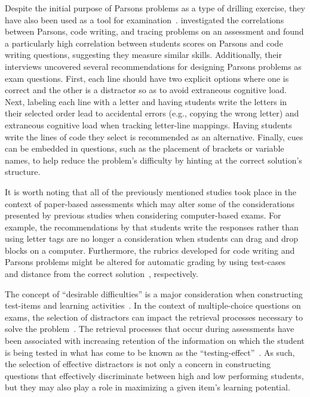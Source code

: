 \documentclass[authorversion,nonacm]{acmart}
\begin{document}
Despite the initial purpose of Parsons problems as a type of drilling exercise,
they have also been used as a tool for examination~\cite{ lister2010naturally,
lopez2008relationships}.  \citet{denny2008evaluating} investigated the
correlations between Parsons, code writing, and tracing problems on an
assessment and found a particularly high correlation between students scores on
Parsons and code writing questions, suggesting they measure similar skills.
Additionally, their interviews uncovered several recommendations for designing
Parsons problems as exam questions.  First, each line should have two explicit
options where one is correct and the other is a distractor so as to avoid
extraneous cognitive load. Next, labeling each line with a letter and having
students write the letters in their selected order lead to accidental errors
(e.g., copying the wrong letter) and extraneous cognitive load  when tracking
letter-line mappings. Having students write the lines of code they select is
recommended as an alternative. Finally, cues can be embedded in questions, such
as the placement of brackets or variable names, to help reduce the problem's
difficulty by hinting at the correct solution's structure.  

It is worth noting that all of the previously mentioned studies took place
in the context of paper-based assessments which may alter some of the
considerations presented by previous studies when considering computer-based
exams. For example, the recommendations by \citet{denny2008evaluating} that
students write the responses rather than using letter tags are no longer a
consideration when students can drag and drop blocks on a computer.
Furthermore, the rubrics developed for code writing and Parsons problems might
be altered for automatic grading by using test-cases~\cite{
eddelbuettel2020r} and distance from the correct
solution~\cite{poulsen2022efficient}, respectively. 

The concept of ``desirable difficulties'' is a major consideration when
constructing test-items and learning activities~\cite{bjork2011making,
bjork2014multiple}.  In the context of multiple-choice questions on exams, the
selection of distractors can impact the retrieval processes necessary to solve
the problem~\cite{little2015optimizing}. The retrieval processes that occur 
during assessments have been associated with increasing retention of the
information on which the student is being tested in what has come to be known
as the ``testing-effect''~\cite{izawa1966reinforcement, rowland2014effect}.  As
such, the selection of effective distractors is not only a concern in
constructing questions that effectively discriminate between high and low
performing students, but they may also play a role in maximizing a given item's
learning potential.
\end{document}
